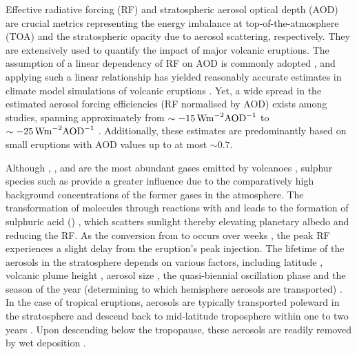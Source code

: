 \documentclass[draft]{agujournal2019}
\begin{document}
  Effective radiative forcing (RF) and stratospheric aerosol optical depth (AOD) are
  crucial metrics representing the energy imbalance at top-of-the-atmosphere (TOA) and
  the stratospheric opacity due to aerosol scattering, respectively. They are
  extensively used to quantify the impact of major volcanic eruptions. The assumption of
  a linear dependency of RF on AOD is commonly adopted \cite{myhre2013,andersson2015},
  and applying such a linear relationship has yielded reasonably accurate estimates in
  climate model simulations of volcanic eruptions
  \cite{mills2017,hansen2005,gregory2016,marshall2020,pitari2016b}. Yet, a wide spread
  in the estimated aerosol forcing efficiencies (RF normalised by AOD) exists among
  studies, spanning approximately from \(\sim \SI{-15}{\watt\metre^{-2}\ce{AOD}^{-1}}\)
  \cite{pitari2016b} to \(\sim \SI{-25}{\watt\metre^{-2}\ce{AOD}^{-1}}\)
  \cite{myhre2013}. Additionally, these estimates are predominantly based on small
  eruptions with AOD values up to at most \(\sim 0.7\).

  Although , , and  are the most abundant gases emitted by
  volcanoes \cite{robock2000}, sulphur species such as  provide a greater
  influence due to the comparatively high background concentrations of the former gases
  in the atmosphere. The transformation of  molecules through reactions with
   and  leads to the formation of sulphuric acid ()
  \cite{robock2000}, which scatters sunlight thereby elevating planetary albedo and
  reducing the RF. As the conversion from  to  occurs over weeks
  \cite{robock2000}, the peak RF experiences a slight delay from the eruption's peak
   injection. The lifetime of the  aerosols in the stratosphere
  depends on various factors, including latitude \cite{marshall2019, toohey2019},
  volcanic plume height \cite{marshall2019}, aerosol size \cite{marshall2019}, the
  quasi-biennial oscillation phase \cite{pitari2016b} and the season of the year
  (determining to which hemisphere aerosols are transported)
  \cite{toohey2011,toohey2019}. In the case of tropical eruptions, aerosols are
  typically transported poleward in the stratosphere and descend back to mid-latitude
  troposphere within one to two years \cite{robock2000}. Upon descending below the
  tropopause, these aerosols are readily removed by wet deposition \cite{liu2012}.
\end{document}
